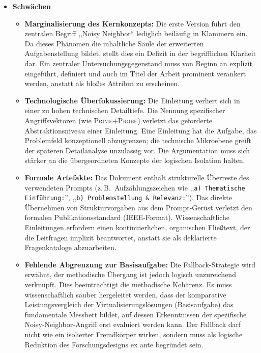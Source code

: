 \documentclass[
  11pt,
  a4paper,
  parskip=half         %
]{scrartcl}
\begin{document}
\begin{itemize}
  \item \textbf{Schwächen}
  \begin{itemize}
    \item \textbf{Marginalisierung des Kernkonzepts:} Die erste Version führt den zentralen Begriff
          ,,Noisy Neighbor`` lediglich beiläufig in Klammern ein. Da dieses Phänomen die inhaltliche
          Säule der erweiterten Aufgabenstellung bildet, stellt dies ein Defizit in der begrifflichen
          Klarheit dar. Ein zentraler Untersuchungsgegenstand muss von Beginn an explizit eingeführt,
          definiert und auch im Titel der Arbeit prominent verankert werden, anstatt als bloßes Attribut
          zu erscheinen.
    \item \textbf{Technologische Überfokussierung:} Die Einleitung verliert sich in einer zu
          hohen technischen Detailtiefe. Die Nennung spezifischer Angriffsvektoren (wie \textsc{Prime+Probe})
          verletzt das geforderte Abstraktionsniveau einer Einleitung. Eine Einleitung hat die Aufgabe,
          das Problemfeld konzeptionell abzugrenzen; die technische Mikroebene greift der späteren
          Detailanalyse unzulässig vor. Die Argumentation muss sich stärker an die übergeordneten
          Konzepte der logischen Isolation halten.
    \item \textbf{Formale Artefakte:} Das Dokument enthält strukturelle Überreste des verwendeten
          Prompts (z.\,B.\ Aufzählungszeichen wie ,,\texttt{a) Thematische Einführung:}'',
          ,,\texttt{b) Problemstellung \& Relevanz:}''). Das direkte Übernehmen von Strukturvorgaben
          aus dem Prompt-Gerüst verletzt den formalen Publikationsstandard (IEEE-Format).
          Wissenschaftliche Einleitungen erfordern einen kontinuierlichen, organischen Fließtext, der
          die Leitfragen implizit beantwortet, anstatt sie als deklarierte Fragenkataloge abzuarbeiten.
    \item \textbf{Fehlende Abgrenzung zur Basisaufgabe:} Die Fallback-Strategie wird erwähnt,
          der methodische Übergang ist jedoch logisch unzureichend verknüpft. Dies beeinträchtigt die
          methodische Kohärenz. Es muss wissenschaftlich sauber hergeleitet werden, dass der komparative
          Leistungsvergleich der Virtualisierungslösungen (Basisaufgabe) das fundamentale Messbett bildet,
          auf dessen Erkenntnissen der spezifische Noisy-Neighbor-Angriff erst evaluiert werden kann.
          Der Fallback darf nicht wie ein isolierter Fremdkörper wirken, sondern muss als logische Reduktion
          des Forschungsdesigns ex ante begründet sein.
  \end{itemize}
\end{itemize}
\end{document}
